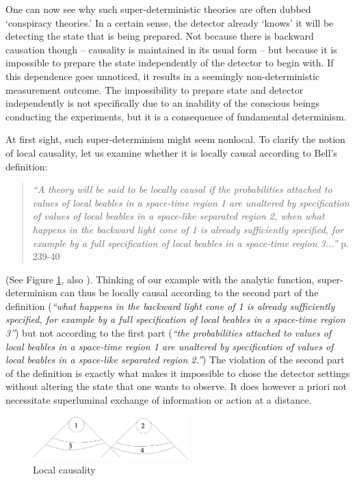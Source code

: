 \documentclass[12pt]{article}                    %
\begin{document}
One can now see why such super-deterministic theories are often dubbed `conspiracy theories.' 
In a certain sense, the detector already `knows' it will be detecting the
state that is being prepared. Not because there is backward causation
though -- causality is maintained in
its usual form -- but because it is impossible to prepare the state independently
of the detector to begin with. 
If this dependence goes unnoticed, it results in a seemingly non-deterministic 
measurement outcome. The impossibility to prepare state and detector independently
is not specifically due to an inability of the conscious beings conducting the 
experiments, but it is a consequence of fundamental determinism. 

At first sight, such super-determinism might seem nonlocal. 
To clarify the notion of local causality, let us examine whether it is locally causal according 
to Bell's definition:
\begin{quote}
 {\it ``A theory will be said to be locally causal if the probabilities attached to values of local beables in a space-time region 1 are unaltered by specification of values of local beables in a space-like separated region 2, when what happens in the backward light cone of 1 is already sufficiently specified, for example by a full specification of local beables in a space-time region 3...''} \cite{Bell} p. 239-40
\end{quote}

(See Figure \ref{fig1}, also \cite{lc}). Thinking of our example with the analytic function, super-determinism can thus be locally causal 
according to the second part of the definition ({\it ``what happens in the backward light cone of 1 is already sufficiently specified, for example by a full specification of local beables in a space-time region 3''}) but not according to the first part ({\it ``the probabilities attached to values of local beables in a space-time region 1 are unaltered by specification of values of local beables in a space-like separated region 2.''}) The violation of
the second part of the definition is exactly what makes it impossible to chose the detector settings without altering the state that one wants to observe. It does however a priori not 
necessitate superluminal exchange of information or action at a distance.


\begin{figure} 
\hspace*{1.0cm}
\includegraphics[width=6cm]{1234.eps}
 
\caption{Local causality \label{fig1}}
\end{figure} 
\end{document}
